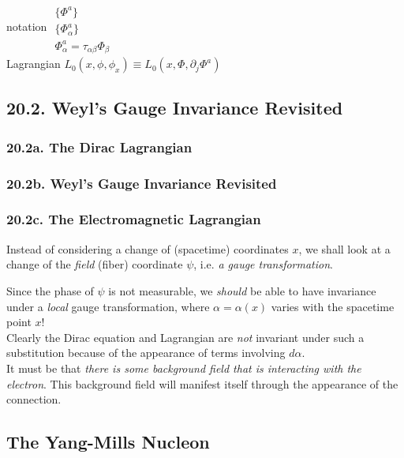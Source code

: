 notation $\begin{gathered} \quad \\
  \lbrace \Phi^a \rbrace \\ 
  \lbrace \Phi^a_{\alpha} \rbrace \\
\Phi^a_{\alpha} = \tau_{\alpha \beta} \Phi_{\beta} \end{gathered}$ \\

Lagrangian $L_0(x, \phi, \phi_x) \equiv L_0(x,\Phi, \partial_j \Phi^a)$



\subsection{20.2. Weyl's Gauge Invariance Revisited}

\subsubsection{ 20.2a. The Dirac Lagrangian }

\subsubsection{ 20.2b. Weyl's Gauge Invariance Revisited}

\subsubsection{ 20.2c. The Electromagnetic Lagrangian }

Instead of considering a change of (spacetime) coordinates $x$, we shall look at a change of the \emph{field} (fiber) coordinate $\psi$, i.e. \emph{a gauge transformation}.  

Since the phase of $\psi$ is not measurable, we \emph{should} be able to have invariance under a \emph{local} gauge transformation, where $\alpha = \alpha(x)$ varies with the spacetime point $x$!  \\
\quad Clearly the Dirac equation and Lagrangian are \emph{not} invariant under such a substitution because of the appearance of terms involving $d\alpha$.  \\
\quad It must be that \emph{there is some background field that is interacting with the electron}.  This background field will manifest itself through the appearance of the connection.  






\subsection{ The Yang-Mills Nucleon }

